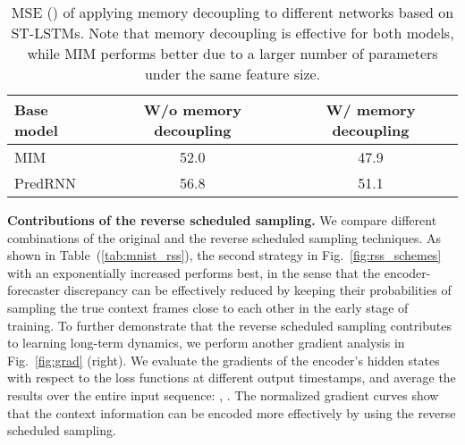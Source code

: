 \documentclass[10pt,journal,compsoc]{IEEEtran}
\let\MYoriglatexcaption\caption
\renewcommand{\caption}[2][\relax]{\MYoriglatexcaption[#2]{#2}}
\newcommand{\tab}[1]{Table~(\ref{#1})}
\newcommand{\fig}[1]{Fig.~\ref{#1}}
\newcommand{\myparagraph}[1]{\vspace{5pt} \noindent \textbf{#1.}}
\begin{document}
\begin{table}[b]
\caption{MSE () of applying memory decoupling to different networks based on ST-LSTMs. 
  Note that memory decoupling is effective for both models, while MIM performs better due to a larger number of parameters under the same feature size.}
  \vskip -0.05in
  \label{tab:mnist_decouple}
  \centering
  \renewcommand{\multirowsetup}{\centering}  
  \begin{tabular}{lcc}
    \toprule
    Base model & W/o memory decoupling & W/ memory decoupling \\
    \midrule
    MIM \cite{wang2019memory} & 52.0 & 47.9  \\
    PredRNN  & 56.8 & 51.1 \\
    \bottomrule
  \end{tabular}
\end{table}



\myparagraph{Contributions of the reverse scheduled sampling}
We compare different combinations of the original and the reverse scheduled sampling techniques.
As shown in \tab{tab:mnist_rss}, the second strategy in \fig{fig:rss_schemes} with an exponentially increased  performs best, in the sense that the encoder-forecaster discrepancy can be effectively reduced by keeping their probabilities of sampling the true context frames close to each other in the early stage of training.
To further demonstrate that the reverse scheduled sampling contributes to learning long-term dynamics, we perform another gradient analysis in \fig{fig:grad} (right).
We evaluate the gradients of the encoder's hidden states with respect to the loss functions at different output timestamps, and average the results over the entire input sequence: , .
The normalized gradient curves show that the context information can be encoded more effectively by using the reverse scheduled sampling.
\end{document}
